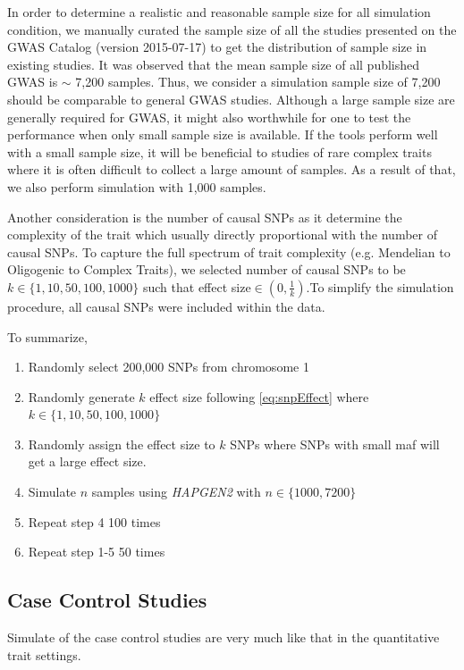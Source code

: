 \documentclass{book}
\begin{document}
			In order to determine a realistic and reasonable sample size for all simulation condition, we manually curated the sample size of all the studies presented on the \gls{GWAS} Catalog\cite{Welter2014} (version 2015-07-17) to get the distribution of sample size in existing studies.
			It was observed that the mean sample size of all published \gls{GWAS} is $\sim$ 7,200 samples. 
			Thus, we consider a simulation sample size of 7,200 should be comparable to general \gls{GWAS} studies.
			Although a large sample size are generally required for \gls{GWAS}, it might also worthwhile for one to test the performance when only small sample size is available.
			If the tools perform well with a small sample size, it will be beneficial to studies of rare complex traits where it is often difficult to collect a large amount of samples.
			As a result of that, we also perform simulation with 1,000 samples.
			
			Another consideration is the number of causal \glspl{SNP} as it determine the complexity of the trait which usually directly proportional with the number of causal \glspl{SNP}. 
			To capture the full spectrum of trait complexity (e.g. Mendelian to Oligogenic to Complex Traits), we selected number of causal \glspl{SNP} to be $k\in\{1,10,50,100,1000\}$ such that effect size$ \in(0,\frac{1}{k})$.To simplify the simulation procedure, all causal \glspl{SNP} were included within the data.
			
			To summarize, 
			\begin{enumerate}
				\item Randomly select 200,000 \glspl{SNP} from chromosome 1
				\item Randomly generate $k$ effect size following \cref{eq:snpEffect} where $k \in \{1,10,50,100,1000\}$
				\item Randomly assign the effect size to $k$ \glspl{SNP} where \glspl{SNP} with small \gls{maf} will get a large effect size.
				\item Simulate $n$ samples using \textit{HAPGEN2} with $n \in \{1000,7200\}$
				\item Repeat step 4 100 times
				\item Repeat step 1-5 50 times
			\end{enumerate}
		\subsection{Case Control Studies}
		Simulate of the case control studies are very much like that in the quantitative trait settings. 
		
\end{document}
